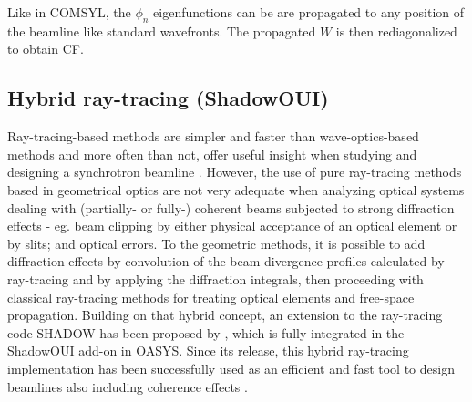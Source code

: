 \documentclass{iucr}              %
\begin{document}
Like in COMSYL, the $\phi_n$ eigenfunctions can be are propagated to any position of the beamline like standard wavefronts. The propagated $W$ is then rediagonalized to obtain CF. 




\subsection{Hybrid ray-tracing (ShadowOUI)}

Ray-tracing-based methods are simpler and faster than wave-optics-based methods and more often than not, offer useful insight when studying and designing a synchrotron beamline \cite{hierarchical}. However, the use of pure ray-tracing methods based in geometrical optics are not very adequate when analyzing optical systems dealing with (partially- or fully-) coherent beams subjected to strong diffraction effects - eg. beam clipping by either physical acceptance of an optical element or by slits; and optical errors. To the geometric methods, it is possible to add diffraction effects by convolution of the beam divergence profiles calculated by ray-tracing and by applying the diffraction integrals, then proceeding with classical ray-tracing methods for treating optical elements and free-space propagation. Building on that hybrid concept, an extension to the ray-tracing code SHADOW \cite{codeSHADOW} has been proposed by , which is fully integrated in the ShadowOUI \cite{codeSHADOWOUI} add-on in OASYS. Since its release, this hybrid ray-tracing implementation has been successfully used as an efficient and fast tool to design beamlines also including coherence effects \cite{Shi2017,Luca2020, Lordano2022}.

\end{document}
